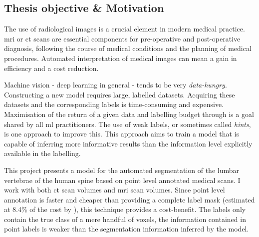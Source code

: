 \begin{multicols}{2}
\section*{Thesis objective \& Motivation}
\par{
    The use of radiological images is a crucial element in modern medical practice. 
    \acrfull{mri} or \acrfull{ct} scans are essential components for pre-operative and post-operative diagnosis, following the course of medical conditions and the planning of medical procedures.
    Automated interpretation of medical images can mean a gain in efficiency and a cost reduction.
}
\par{
    Machine vision - deep learning in general - tends to be very \textit{data-hungry}. Constructing a new model requires large, labelled datasets.
    Acquiring these datasets and the corresponding labels is time-consuming and expensive. 
    Maximisation of the return of a given data and labelling budget through is a goal shared by all \acrshort{ml} practitioners.
    The use of weak labels, or sometimes called \textit{hints}, is one approach to improve this.
    This approach aims to train a model that is capable of inferring more informative results than the information level explicitly available in the labelling.
}
\par{
    This project presents a model for the automated segmentation of the lumbar vertebrae of the human spine based on point level annotated medical scans.
    I work with both \acrshort{ct} scan volumes and \acrshort{mri} scan volumes.
    Since point level annotation is faster and cheaper than providing a complete label mask (estimated at 8.4\% of the cost by \cite{Bearman2015}), this technique provides a cost-benefit. 
    The labels only contain the true class of a mere handful of voxels, the information contained in point labels is weaker than the segmentation information inferred by the model.
}




\end{multicols}
